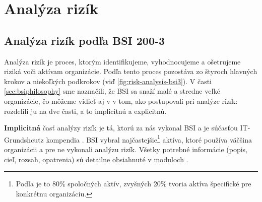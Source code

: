 




\chapter{Analýza rizík}
\label{chap:risk-analysis}
\section{Analýza rizík podľa BSI 200-3}
Analýza rizík je proces, ktorým identifikujeme, vyhodnocujeme a ošetrujeme riziká voči aktívam organizácie.
Podľa \cite{BSI3} tento proces pozostáva zo štyroch hlavných krokov a niekoľkých podkrokov (viď \ref{fig:risk-analysis-bsi3}).
V časti \ref{sec:bsiphilosophy} sme naznačili, že BSI sa snaží  malé a stredne veľké organizácie, čo môžeme vidieť aj v
v tom, ako postupovali pri analýze rizík: rozdelili ju na dve časti, a to implicitnú a explicitnú.



\textbf{Implicitná} časť analýzy rizík je tá, ktorú za nás vykonal BSI a je súčasťou IT-Grundshcutz kompendia \cite{GSK}. BSI vybral
najčastejšie\footnote{Podľa \cite{mngmtkib} je to 80\% spoločných aktív, zvyšných 20\% tvoria aktíva špecifické pre konkrétnu organizáciu.}
aktíva, ktoré používa väčšina organizácii a pre ne vykonali analýzu rizík. Všetky potrebné informácie (popis, cieľ, rozsah, opatrenia) sú
detailne obsiahnuté v moduloch \cite{GSK}.

